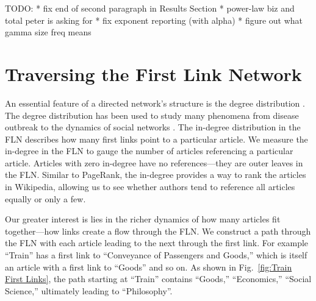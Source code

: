 \documentclass[pre,twocolumn,twoside,superscriptaddress,floatfix, aps, 10pt]{revtex4-1}
\begin{document}
\maketitle

TODO: 
* fix end of second paragraph in Results Section
    * power-law biz and total peter is asking for
* fix exponent reporting (with alpha) 
    * figure out what gamma size freq means

\section{Traversing the First Link Network}

An essential feature of a directed network's structure is the degree distribution 
\cite{newman}. 
The degree distribution has been used to study many phenomena from disease outbreak 
\cite{disease} 
to the dynamics of social networks 
\cite{social_nets}.
The in-degree distribution in the FLN describes how many first links point to a 
particular article. 
We measure the in-degree in the FLN to gauge the number of articles referencing a particular article.
Articles with zero in-degree have no references---they are outer leaves in the FLN. 
Similar to PageRank, the in-degree 
provides a way to rank the articles in Wikipedia, allowing us to see 
whether authors tend to reference all articles equally or only a few.


Our greater interest is lies in the richer dynamics of how many articles fit together---how links create a flow through the FLN.
We construct a path through the FLN with each article 
leading to the next through the first link. 
For example ``Train'' has a first link to ``Conveyance of Passengers and Goods,'' which is itself
an article with a first link to ``Goods'' and so on. 
As shown in Fig.~\ref{fig:Train First Links}, the path starting at ``Train'' 
contains ``Goods,'' ``Economics,'' ``Social Science,''
ultimately leading to ``Philosophy''.
\end{document}
